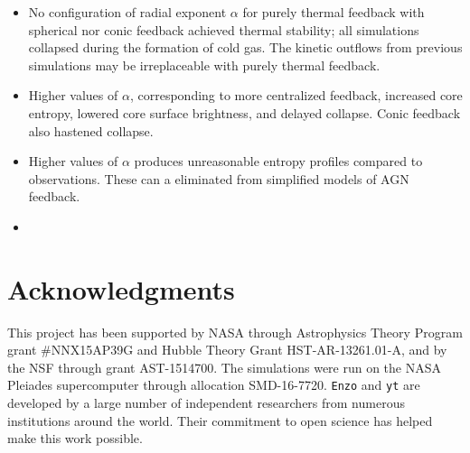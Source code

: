 \documentclass[iop,apjl, twocolappendix]{emulateapj}   %
\begin{document}
\begin{itemize}
  \item No configuration of radial exponent $\alpha$ for purely thermal feedback with
    spherical nor conic feedback achieved thermal stability; all simulations
    collapsed during the formation of cold gas. The kinetic outflows from
    previous simulations may be irreplaceable with purely thermal feedback.
  \item Higher values of $\alpha$, corresponding to more centralized feedback,
    increased core entropy, lowered core surface brightness, and delayed
    collapse. Conic feedback also hastened collapse.
  \item Higher values of $\alpha$ produces unreasonable entropy profiles
    compared to observations. These can a eliminated from simplified models of
    AGN feedback.
  \item 
\end{itemize}

\acknowledgments
\section{Acknowledgments}
\label{sec:acknowledgments}
This project has been supported by NASA through Astrophysics Theory Program
grant \#NNX15AP39G and Hubble Theory Grant HST-AR-13261.01-A, and by the
NSF through grant AST-1514700.  The simulations were run on the NASA
Pleiades supercomputer through allocation SMD-16-7720.  \texttt{Enzo} and
\texttt{yt} are developed by a large number of independent researchers from
numerous institutions around the world. Their commitment to open science
has helped make this work possible.

%



\end{document}
